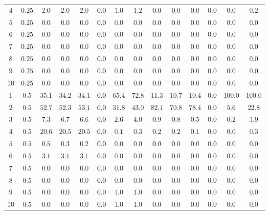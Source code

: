 \begin{tabular}{cccccccccccccc}
$4$ & $0.25$ & $2.0$ & $2.0$ & $2.0$ & $0.0$ & $1.0$ & $1.2$ & $0.0$ & $0.0$ & $0.0$ & $0.0$ & $0.0$ & $0.2$\\
$5$ & $0.25$ & $0.0$ & $0.0$ & $0.0$ & $0.0$ & $0.0$ & $0.0$ & $0.0$ & $0.0$ & $0.0$ & $0.0$ & $0.0$ & $0.0$\\
$6$ & $0.25$ & $0.0$ & $0.0$ & $0.0$ & $0.0$ & $0.0$ & $0.0$ & $0.0$ & $0.0$ & $0.0$ & $0.0$ & $0.0$ & $0.0$\\
$7$ & $0.25$ & $0.0$ & $0.0$ & $0.0$ & $0.0$ & $0.0$ & $0.0$ & $0.0$ & $0.0$ & $0.0$ & $0.0$ & $0.0$ & $0.0$\\
$8$ & $0.25$ & $0.0$ & $0.0$ & $0.0$ & $0.0$ & $0.0$ & $0.0$ & $0.0$ & $0.0$ & $0.0$ & $0.0$ & $0.0$ & $0.0$\\
$9$ & $0.25$ & $0.0$ & $0.0$ & $0.0$ & $0.0$ & $0.0$ & $0.0$ & $0.0$ & $0.0$ & $0.0$ & $0.0$ & $0.0$ & $0.0$\\
$10$ & $0.25$ & $0.0$ & $0.0$ & $0.0$ & $0.0$ & $0.0$ & $0.0$ & $0.0$ & $0.0$ & $0.0$ & $0.0$ & $0.0$ & $0.0$\\
$1$ & $0.5$ & $35.1$ & $34.2$ & $34.1$ & $0.0$ & $65.4$ & $72.8$ & $11.3$ & $10.7$ & $10.4$ & $0.0$ & $100.0$ & $100.0$\\
$2$ & $0.5$ & $52.7$ & $52.3$ & $53.1$ & $0.0$ & $31.8$ & $43.0$ & $82.1$ & $70.8$ & $78.4$ & $0.0$ & $5.6$ & $22.8$\\
$3$ & $0.5$ & $7.3$ & $6.7$ & $6.6$ & $0.0$ & $2.6$ & $4.0$ & $0.9$ & $0.8$ & $0.5$ & $0.0$ & $0.2$ & $1.9$\\
$4$ & $0.5$ & $20.6$ & $20.5$ & $20.5$ & $0.0$ & $0.1$ & $0.3$ & $0.2$ & $0.2$ & $0.1$ & $0.0$ & $0.0$ & $0.3$\\
$5$ & $0.5$ & $0.5$ & $0.3$ & $0.2$ & $0.0$ & $0.0$ & $0.0$ & $0.0$ & $0.0$ & $0.0$ & $0.0$ & $0.0$ & $0.0$\\
$6$ & $0.5$ & $3.1$ & $3.1$ & $3.1$ & $0.0$ & $0.0$ & $0.0$ & $0.0$ & $0.0$ & $0.0$ & $0.0$ & $0.0$ & $0.0$\\
$7$ & $0.5$ & $0.0$ & $0.0$ & $0.0$ & $0.0$ & $0.0$ & $0.0$ & $0.0$ & $0.0$ & $0.0$ & $0.0$ & $0.0$ & $0.0$\\
$8$ & $0.5$ & $0.0$ & $0.0$ & $0.0$ & $0.0$ & $0.0$ & $0.0$ & $0.0$ & $0.0$ & $0.0$ & $0.0$ & $0.0$ & $0.0$\\
$9$ & $0.5$ & $0.0$ & $0.0$ & $0.0$ & $0.0$ & $1.0$ & $1.0$ & $0.0$ & $0.0$ & $0.0$ & $0.0$ & $0.0$ & $0.0$\\
$10$ & $0.5$ & $0.0$ & $0.0$ & $0.0$ & $0.0$ & $1.0$ & $1.0$ & $0.0$ & $0.0$ & $0.0$ & $0.0$ & $0.0$ & $0.0$\\
\end{tabular}

